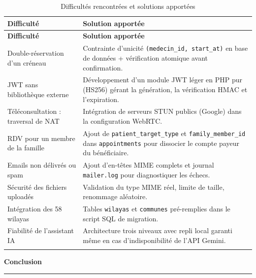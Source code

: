 \documentclass[12pt,a4paper]{report}
\begin{document}
\begin{longtable}{|p{5.5cm}|p{9cm}|}
\hline
\textbf{Difficult\'e} & \textbf{Solution apport\'ee} \\
\hline
\endfirsthead
\hline
\textbf{Difficult\'e} & \textbf{Solution apport\'ee} \\
\hline
\endhead
\hline
\endlastfoot
Double-r\'eservation d'un cr\'eneau & Contrainte d'unicit\'e \texttt{(medecin\_id, start\_at)} en base de donn\'ees + v\'erification atomique avant confirmation. \\
\hline
JWT sans biblioth\`eque externe & D\'eveloppement d'un module JWT l\'eger en PHP pur (HS256) g\'erant la g\'en\'eration, la v\'erification HMAC et l'expiration. \\
\hline
T\'el\'econsultation : traversal de NAT & Int\'egration de serveurs STUN publics (Google) dans la configuration WebRTC. \\
\hline
RDV pour un membre de la famille & Ajout de \texttt{patient\_target\_type} et \texttt{family\_member\_id} dans \texttt{appointments} pour dissocier le compte payeur du b\'en\'eficiaire. \\
\hline
Emails non d\'elivr\'es ou spam & Ajout d'en-t\^etes MIME complets et journal \texttt{mailer.log} pour diagnostiquer les \'echecs. \\
\hline
S\'ecurit\'e des fichiers upload\'es & Validation du type MIME r\'eel, limite de taille, renommage al\'eatoire. \\
\hline
Int\'egration des 58 wilayas & Tables \texttt{wilayas} et \texttt{communes} pr\'e-remplies dans le script SQL de migration. \\
\hline
Fiabilit\'e de l'assistant IA & Architecture trois niveaux avec repli local garanti m\^eme en cas d'indisponibilit\'e de l'API Gemini. \\
\hline
\caption{Difficult\'es rencontr\'ees et solutions apport\'ees}
\end{longtable}

\newpage

\thispagestyle{fancy}
\vspace*{\fill}

\begin{center}
{\Huge\bfseries Conclusion}

\vspace{0.3cm}

\rule{0.5\textwidth}{1.2pt}
\end{center}
\end{document}
